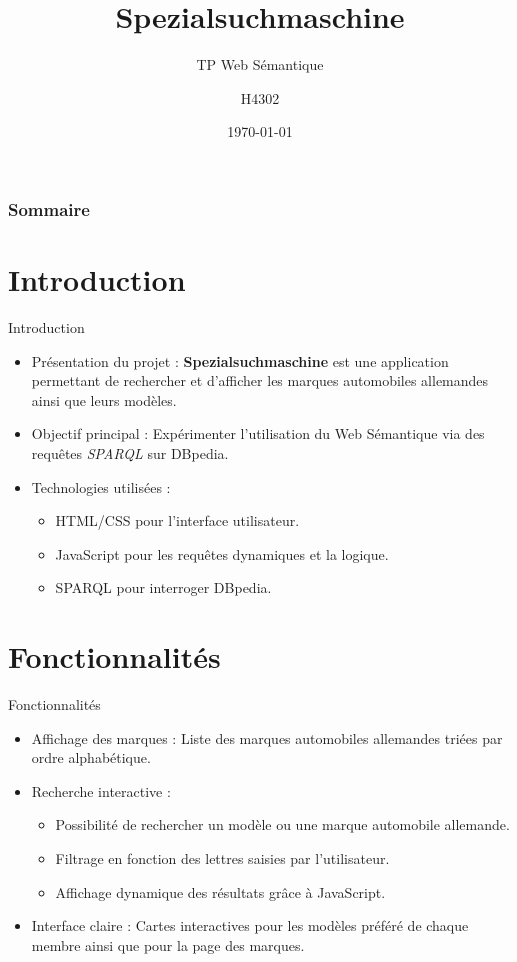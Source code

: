 \documentclass[10pt]{beamer}
\title[Spezialsuchmaschine]{Spezialsuchmaschine}
\subtitle{TP Web Sémantique}
\author[H4302]{H4302}
\institute[]{ INSA Lyon

Département Informatique}
\date[\today]
{\today}
\begin{document}
\frame{\titlepage}

\begin{frame}
\frametitle{Sommaire}
\tableofcontents
\end{frame}

\section{Introduction}
\begin{frame}{Introduction}
\begin{itemize}
    \item Présentation du projet : \textbf{Spezialsuchmaschine} est une application permettant de rechercher et d’afficher les marques automobiles allemandes ainsi que leurs modèles.  
    \item Objectif principal : Expérimenter l'utilisation du Web Sémantique via des requêtes \textit{SPARQL} sur DBpedia.
    \item Technologies utilisées :  
        \begin{itemize}
            \item HTML/CSS pour l'interface utilisateur.  
            \item JavaScript pour les requêtes dynamiques et la logique.  
            \item SPARQL pour interroger DBpedia.  
        \end{itemize}
\end{itemize}
\end{frame}

\section{Fonctionnalités}
\begin{frame}{Fonctionnalités}
\begin{itemize}
    \item Affichage des marques : Liste des marques automobiles allemandes triées par ordre alphabétique.  
    \item Recherche interactive :
        \begin{itemize}
            \item Possibilité de rechercher un modèle ou une marque automobile allemande.
            \item Filtrage en fonction des lettres saisies par l'utilisateur.  
            \item Affichage dynamique des résultats grâce à JavaScript.  
        \end{itemize}
    \item Interface claire : Cartes interactives pour les modèles préféré de chaque membre ainsi que pour la page des marques.
\end{itemize}
\end{frame}
\end{document}
